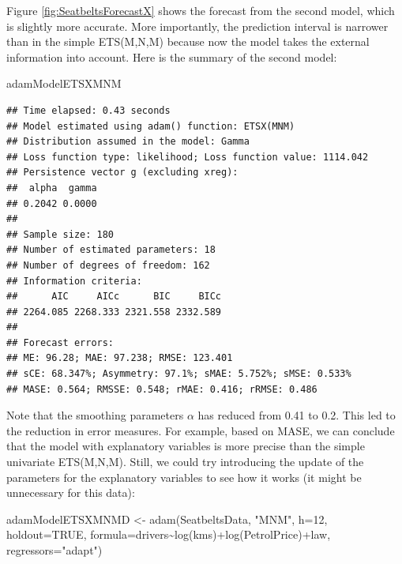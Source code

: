\documentclass[
]{book}
\newenvironment{Shaded}{\begin{snugshade}}{\end{snugshade}}
\newcommand{\AttributeTok}[1]{\textcolor[rgb]{0.77,0.63,0.00}{#1}}
\newcommand{\ConstantTok}[1]{\textcolor[rgb]{0.00,0.00,0.00}{#1}}
\newcommand{\DecValTok}[1]{\textcolor[rgb]{0.00,0.00,0.81}{#1}}
\newcommand{\FunctionTok}[1]{\textcolor[rgb]{0.00,0.00,0.00}{#1}}
\newcommand{\NormalTok}[1]{#1}
\newcommand{\OtherTok}[1]{\textcolor[rgb]{0.56,0.35,0.01}{#1}}
\newcommand{\SpecialCharTok}[1]{\textcolor[rgb]{0.00,0.00,0.00}{#1}}
\newcommand{\StringTok}[1]{\textcolor[rgb]{0.31,0.60,0.02}{#1}}
\theoremstyle{definition}
\theoremstyle{definition}
\theoremstyle{definition}
\theoremstyle{definition}
\theoremstyle{remark}
\begin{document}
Figure \ref{fig:SeatbeltsForecastX} shows the forecast from the second model, which is slightly more accurate. More importantly, the prediction interval is narrower than in the simple ETS(M,N,M) because now the model takes the external information into account. Here is the summary of the second model:

\begin{Shaded}
\begin{Highlighting}[]
\NormalTok{adamModelETSXMNM}
\end{Highlighting}
\end{Shaded}

\begin{verbatim}
## Time elapsed: 0.43 seconds
## Model estimated using adam() function: ETSX(MNM)
## Distribution assumed in the model: Gamma
## Loss function type: likelihood; Loss function value: 1114.042
## Persistence vector g (excluding xreg):
##  alpha  gamma 
## 0.2042 0.0000 
## 
## Sample size: 180
## Number of estimated parameters: 18
## Number of degrees of freedom: 162
## Information criteria:
##      AIC     AICc      BIC     BICc 
## 2264.085 2268.333 2321.558 2332.589 
## 
## Forecast errors:
## ME: 96.28; MAE: 97.238; RMSE: 123.401
## sCE: 68.347%; Asymmetry: 97.1%; sMAE: 5.752%; sMSE: 0.533%
## MASE: 0.564; RMSSE: 0.548; rMAE: 0.416; rRMSE: 0.486
\end{verbatim}

Note that the smoothing parameters \(\alpha\) has reduced from 0.41 to 0.2. This led to the reduction in error measures. For example, based on MASE, we can conclude that the model with explanatory variables is more precise than the simple univariate ETS(M,N,M). Still, we could try introducing the update of the parameters for the explanatory variables to see how it works (it might be unnecessary for this data):

\begin{Shaded}
\begin{Highlighting}[]
\NormalTok{adamModelETSXMNMD }\OtherTok{\textless{}{-}} \FunctionTok{adam}\NormalTok{(SeatbeltsData, }\StringTok{"MNM"}\NormalTok{, }\AttributeTok{h=}\DecValTok{12}\NormalTok{, }\AttributeTok{holdout=}\ConstantTok{TRUE}\NormalTok{,}
                          \AttributeTok{formula=}\NormalTok{drivers}\SpecialCharTok{\textasciitilde{}}\FunctionTok{log}\NormalTok{(kms)}\SpecialCharTok{+}\FunctionTok{log}\NormalTok{(PetrolPrice)}\SpecialCharTok{+}\NormalTok{law,}
                          \AttributeTok{regressors=}\StringTok{"adapt"}\NormalTok{)}
\end{Highlighting}
\end{Shaded}
\end{document}
